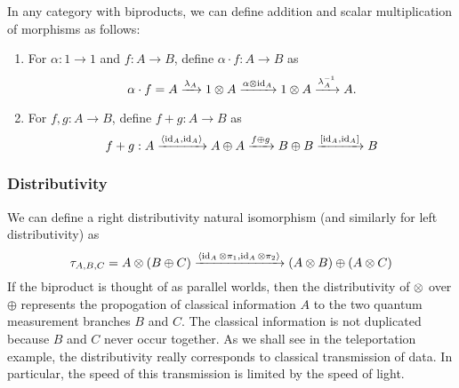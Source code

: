 In any category with biproducts, we can define addition and scalar multiplication
of morphisms as follows:
\begin{enumerate}
    \item For $\alpha : 1 \rightarrow 1$ and $f : A \rightarrow B$, define
    $\alpha \cdot f : A \rightarrow B$ as
    \[ \alpha \cdot f = A
    \xrightarrow{\lambda_A} 1 \otimes A
    \xrightarrow{\alpha \otimes \operatorname{id}_A} 1 \otimes A
    \xrightarrow{\lambda_A^{-1}} A.
    \]
    \item For $f, g : A \rightarrow B$, define $f + g : A \rightarrow B$ as
    \[ f + g : A
    \xrightarrow{\langle \operatorname{id}_A, \operatorname{id}_A \rangle}
    A \oplus A
    \xrightarrow{f \oplus g}
    B \oplus B  
    \xrightarrow{[\operatorname{id}_A,\operatorname{id}_A]}
    B
    \]
\end{enumerate}

\subsubsection*{Distributivity}
We can define a right distributivity natural isomorphism (and similarly for left distributivity)
as
\[
    \tau_{A,B,C} = A \otimes (B \oplus C)
    \xrightarrow{\langle \operatorname{id}_A \otimes \pi_1, \operatorname{id}_A \otimes \pi_2\rangle}
    (A \otimes B) \oplus (A \otimes C)
\]
If the biproduct is thought of as parallel worlds, then the distributivity of $\otimes$
over $\oplus$ represents the propogation of classical information $A$ to the two
quantum measurement branches $B$ and $C$. The classical information is not duplicated
because $B$ and $C$ never occur together. As we shall see in the teleportation
example, the distributivity really corresponds to classical transmission of data.
In particular, the speed of this transmission is limited by the speed of light.


